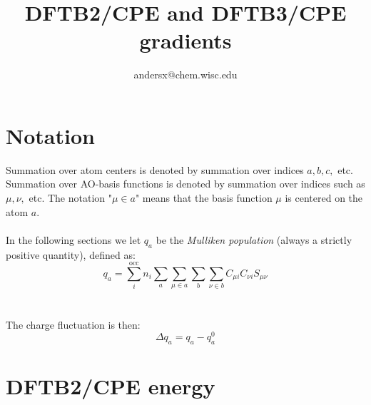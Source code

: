 \documentclass{article}
\title{DFTB2/CPE and DFTB3/CPE gradients}
\author{andersx@chem.wisc.edu}
\numberwithin{equation}{section}
\begin{document}
\section{Notation}
Summation over atom centers is denoted by summation over indices $a, b, c,$ etc. Summation over AO-basis functions is denoted by summation over indices such as $\mu, \nu,$ etc. The notation "$\mu \in a$" means that the basis function $\mu$ is centered on the atom $a$.
\\\\In the following sections we let $q_a$ be the \textit{Mulliken population} (always a strictly positive quantity), defined as:
\begin{equation}
    q_a = \sum_i^\mathrm{occ} n_i \sum_a \sum_{\mu \in a} \sum_b \sum_{\nu \in b}
    C_{\mu i} C_{\nu i} S_{\mu\nu}
\end{equation}
\\\\The charge fluctuation is then: 
\begin{equation}
    \Delta q_a = q_a - q_a^0
\end{equation}


\section{DFTB2/CPE energy}
\end{document}
